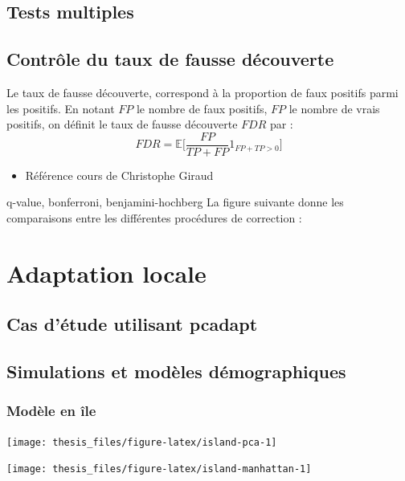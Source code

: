 \documentclass[12pt,a4paper,twoside]{ugathesis}
\providecommand{\tightlist}{%
  \setlength{\itemsep}{0pt}\setlength{\parskip}{0pt}}
\theoremstyle{definition}
\theoremstyle{definition}
\theoremstyle{remark}
\begin{document}
\section{Tests multiples}\label{tests-multiples}

\section{Contrôle du taux de fausse
découverte}\label{controle-du-taux-de-fausse-decouverte}

Le taux de fausse découverte, correspond à la proportion de faux
positifs parmi les positifs. En notant \(FP\) le nombre de faux
positifs, \(FP\) le nombre de vrais positifs, on définit le taux de
fausse découverte \(FDR\) par :
\begin{equation} 
  FDR = \mathbb{E}\Big[\frac{FP}{TP + FP} 1_{FP+TP > 0}\Big] 
  \label{eq:FDR-def}
\end{equation}
\begin{itemize}
\tightlist
\item
  Référence cours de Christophe Giraud
\end{itemize}
q-value, bonferroni, benjamini-hochberg La figure suivante donne les
comparaisons entre les différentes procédures de correction :

\chapter{Adaptation locale}\label{adaptation-locale-1}

\section{Cas d'étude utilisant
pcadapt}\label{cas-detude-utilisant-pcadapt}

\section{Simulations et modèles
démographiques}\label{simulations-et-modeles-demographiques}

\subsection{Modèle en île}\label{modele-en-ile}
\begin{center}\texttt{[image: thesis\_files/figure-latex/island-pca-1]} \end{center}
\begin{center}\texttt{[image: thesis\_files/figure-latex/island-manhattan-1]} \end{center}
\end{document}
